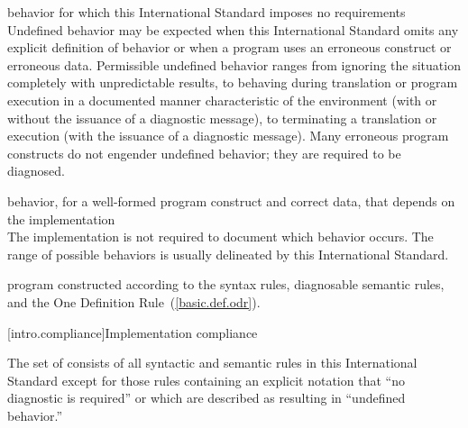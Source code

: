 %
behavior for which this International Standard
imposes no requirements\\
\enternote Undefined behavior may be expected when
this International Standard omits any explicit
definition of behavior or when a program uses an erroneous construct or erroneous data.
Permissible undefined behavior ranges
from ignoring the situation completely with unpredictable results, to
behaving during translation or program execution in a documented manner
characteristic of the environment (with or without the issuance of a
diagnostic message), to terminating a translation or execution (with the
issuance of a diagnostic message). Many erroneous program constructs do
not engender undefined behavior; they are required to be diagnosed.
\exitnote

%
behavior, for a well-formed program construct and correct data, that
depends on the implementation\\
\enternote The implementation is not required to
document which behavior occurs. The range of
possible behaviors is usually delineated by this International Standard.
\exitnote

%
\Cpp  program constructed according to the syntax rules, diagnosable
semantic rules, and the One Definition Rule~(\ref{basic.def.odr}).%

[intro.compliance]{Implementation compliance}

\pnum
{}%
%
The set of
consists of all syntactic and semantic rules in this International
Standard except for those rules containing an explicit notation that
``no diagnostic is required'' or which are described as resulting in
``undefined behavior.''

